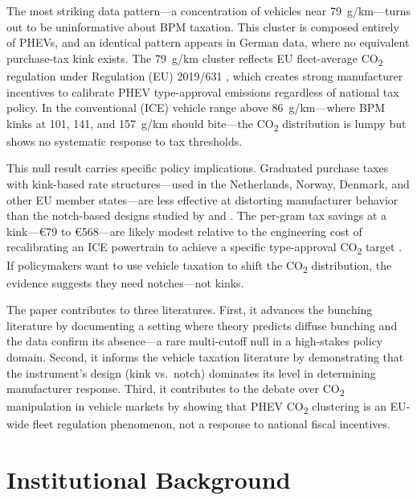\documentclass[12pt]{article}
\begin{document}
The most striking data pattern---a concentration of vehicles near 79~g/km---turns out to be uninformative about BPM taxation. This cluster is composed entirely of PHEVs, and an identical pattern appears in German data, where no equivalent purchase-tax kink exists. The 79~g/km cluster reflects EU fleet-average CO\textsubscript{2} regulation under Regulation (EU) 2019/631 \citep{eu2019631}, which creates strong manufacturer incentives to calibrate PHEV type-approval emissions regardless of national tax policy. In the conventional (ICE) vehicle range above 86~g/km---where BPM kinks at 101, 141, and 157~g/km should bite---the CO\textsubscript{2} distribution is lumpy but shows no systematic response to tax thresholds.

This null result carries specific policy implications. Graduated purchase taxes with kink-based rate structures---used in the Netherlands, Norway, Denmark, and other EU member states---are less effective at distorting manufacturer behavior than the notch-based designs studied by \citet{sallee2012} and \citet{best2014}. The per-gram tax savings at a kink---\euro 79 to \euro 568---are likely modest relative to the engineering cost of recalibrating an ICE powertrain to achieve a specific type-approval CO\textsubscript{2} target \citep{reynaert2021}. If policymakers want to use vehicle taxation to shift the CO\textsubscript{2} distribution, the evidence suggests they need notches---not kinks.

The paper contributes to three literatures. First, it advances the bunching literature \citep{kleven2016} by documenting a setting where theory predicts diffuse bunching and the data confirm its absence---a rare multi-cutoff null in a high-stakes policy domain. Second, it informs the vehicle taxation literature \citep{anderson2012, rivers2017, allcott2014} by demonstrating that the instrument's design (kink vs.\ notch) dominates its level in determining manufacturer response. Third, it contributes to the debate over CO\textsubscript{2} manipulation in vehicle markets \citep{reynaert2021} by showing that PHEV CO\textsubscript{2} clustering is an EU-wide fleet regulation phenomenon, not a response to national fiscal incentives.

\section{Institutional Background}
\end{document}
